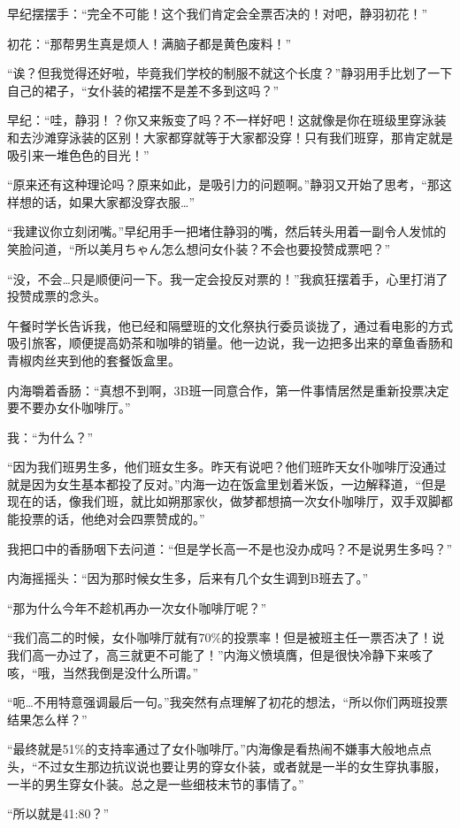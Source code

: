 早纪摆摆手：“完全不可能！这个我们肯定会全票否决的！对吧，静羽初花！”

初花：“那帮男生真是烦人！满脑子都是黄色废料！”

“诶？但我觉得还好啦，毕竟我们学校的制服不就这个长度？”静羽用手比划了一下自己的裙子，“女仆装的裙摆不是差不多到这吗？”

早纪：“哇，静羽！？你又来叛变了吗？不一样好吧！这就像是你在班级里穿泳装和去沙滩穿泳装的区别！大家都穿就等于大家都没穿！只有我们班穿，那肯定就是吸引来一堆色色的目光！”

“原来还有这种理论吗？原来如此，是吸引力的问题啊。”静羽又开始了思考，“那这样想的话，如果大家都没穿衣服…”

“我建议你立刻闭嘴。”早纪用手一把堵住静羽的嘴，然后转头用着一副令人发怵的笑脸问道，“所以美月ちゃん怎么想问女仆装？不会也要投赞成票吧？”

“没，不会…只是顺便问一下。我一定会投反对票的！”我疯狂摆着手，心里打消了投赞成票的念头。

午餐时学长告诉我，他已经和隔壁班的文化祭执行委员谈拢了，通过看电影的方式吸引旅客，顺便提高奶茶和咖啡的销量。他一边说，我一边把多出来的章鱼香肠和青椒肉丝夹到他的套餐饭盒里。

内海嚼着香肠：“真想不到啊，3B班一同意合作，第一件事情居然是重新投票决定要不要办女仆咖啡厅。”

我：“为什么？”

“因为我们班男生多，他们班女生多。昨天有说吧？他们班昨天女仆咖啡厅没通过就是因为女生基本都投了反对。”内海一边在饭盒里划着米饭，一边解释道，“但是现在的话，像我们班，就比如朔那家伙，做梦都想搞一次女仆咖啡厅，双手双脚都能投票的话，他绝对会四票赞成的。”

我把口中的香肠咽下去问道：“但是学长高一不是也没办成吗？不是说男生多吗？”

内海摇摇头：“因为那时候女生多，后来有几个女生调到B班去了。”

“那为什么今年不趁机再办一次女仆咖啡厅呢？”

“我们高二的时候，女仆咖啡厅就有70$\%$的投票率！但是被班主任一票否决了！说我们高一办过了，高三就更不可能了！”内海义愤填膺，但是很快冷静下来咳了咳，“哦，当然我倒是没什么所谓。”

“呃…不用特意强调最后一句。”我突然有点理解了初花的想法，“所以你们两班投票结果怎么样？”

“最终就是51$\%$的支持率通过了女仆咖啡厅。”内海像是看热闹不嫌事大般地点点头，“不过女生那边抗议说也要让男的穿女仆装，或者就是一半的女生穿执事服，一半的男生穿女仆装。总之是一些细枝末节的事情了。”

“所以就是41:80？”

